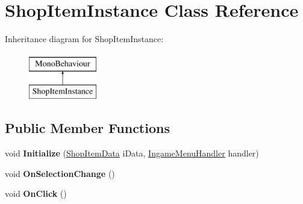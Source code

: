 \hypertarget{class_shop_item_instance}{}\section{Shop\+Item\+Instance Class Reference}
\label{class_shop_item_instance}
Inheritance diagram for Shop\+Item\+Instance\+:\begin{figure}[H]
\begin{center}
\leavevmode
\includegraphics[height=2.000000cm]{class_shop_item_instance}
\end{center}
\end{figure}
\subsection*{Public Member Functions}
\begin{DoxyCompactItemize}
\item 
\hypertarget{class_shop_item_instance_ad3c9deb40e73a7df17cdb35e5fbe9e6e}{}\label{class_shop_item_instance_ad3c9deb40e73a7df17cdb35e5fbe9e6e} 
void {\bfseries Initialize} (\hyperlink{class_shop_item_data}{Shop\+Item\+Data} i\+Data, \hyperlink{class_ingame_menu_handler}{Ingame\+Menu\+Handler} handler)
\item 
\hypertarget{class_shop_item_instance_a32e08dbdd8668fce7a11868597303847}{}\label{class_shop_item_instance_a32e08dbdd8668fce7a11868597303847} 
void {\bfseries On\+Selection\+Change} ()
\item 
\hypertarget{class_shop_item_instance_a11ac225e2023d440ae05b84785bb396d}{}\label{class_shop_item_instance_a11ac225e2023d440ae05b84785bb396d} 
void {\bfseries On\+Click} ()
\end{DoxyCompactItemize}
